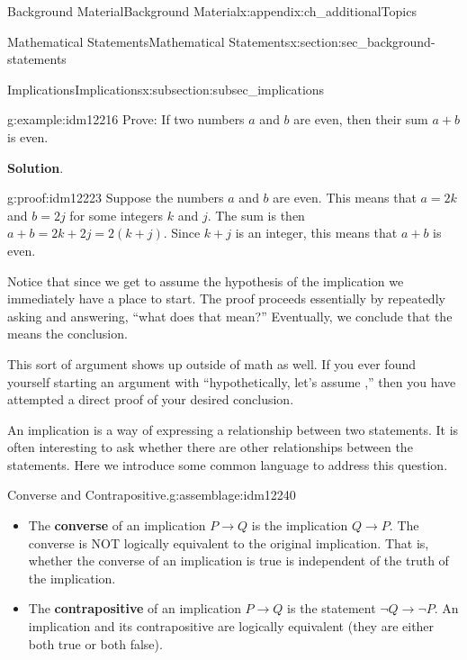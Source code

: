 \documentclass[oneside,10pt,]{book}
\newcommand{\terminology}[1]{\textbf{#1}}
\numberwithin{equation}{chapter}
\def\imp{\rightarrow}
\begin{document}
\begin{appendixptx}{Background Material}{}{Background Material}{}{}{x:appendix:ch_additionalTopics}
\begin{sectionptx}{Mathematical Statements}{}{Mathematical Statements}{}{}{x:section:sec_background-statements}
\begin{subsectionptx}{Implications}{}{Implications}{}{}{x:subsection:subsec_implications}
\begin{example}{}{g:example:idm12216}%
Prove: If two numbers \(a\) and \(b\) are even, then their sum \(a+b\) is even.%
\par\smallskip%
\noindent\textbf{Solution}.\hypertarget{g:solution:idm12222}{}\quad{}\begin{proofptx}{}{g:proof:idm12223}
Suppose the numbers \(a\) and \(b\) are even. This means that  \(a = 2k\) and \(b=2j\) for some integers \(k\) and \(j\). The sum is then \(a+b = 2k+2j = 2(k+j)\). Since \(k+j\) is an integer, this means that \(a+b\) is even.%
\end{proofptx}
Notice that since we get to assume the hypothesis of the implication we immediately have a place to start. The proof proceeds essentially by repeatedly asking and answering, ``what does that mean?''  Eventually, we conclude that the means the conclusion.%
\end{example}
This sort of argument shows up outside of math as well. If you ever found yourself starting an argument with ``hypothetically, let's assume \textellipsis{},'' then you have attempted a direct proof of your desired conclusion.%
\par
An implication is a way of expressing a relationship between two statements.  It is often interesting to ask whether there are other relationships between the statements.  Here we introduce some common language to address this question.%
\begin{assemblage}{Converse and Contrapositive.}{g:assemblage:idm12240}%
%
\begin{itemize}[label=\textbullet]
\item{}The \terminology{converse}  of an implication \(P \imp Q\) is the implication \(Q \imp P\). The converse is NOT logically equivalent to the original implication.  That is, whether the converse of an implication is true is independent of the truth of the implication.%
\item{}The \terminology{contrapositive}  of an implication \(P \imp Q\) is the statement \(\neg Q \imp \neg P\). An implication and its contrapositive are logically equivalent (they are either both true or both false).%
\end{itemize}
%
\end{assemblage}

\end{subsectionptx}
\end{sectionptx}
\end{appendixptx}
\end{document}
